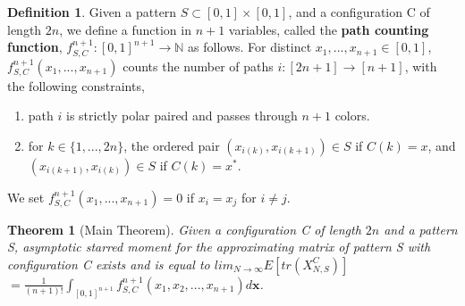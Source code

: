 \documentclass[12pt]{amsart}
\newtheorem{thm}{Theorem}[section]
\theoremstyle{definition}
\newtheorem{defn}{Definition}[section]
\theoremstyle{remark}
\newcommand\red{\color{red}}
\begin{document}
\begin{defn}

    Given a pattern $S \subset [0,1] \times [0,1]$, and a configuration C of length $2n$, we define a function in $n+1$ variables, called the \textbf{path counting function}, $f_{S,C}^{n+1} : [0,1]^{n+1} \to \mathbb{N}$ as follows. For distinct $x_1,...,x_{n+1} \in [0,1]$, $f_{S,C}^{n+1}(x_1,...,x_{n+1})$ counts the number of paths $i:[2n+1] \to [n+1]$, with the following constraints, 
    \begin{enumerate}
    \item path $i$ is strictly polar paired and passes through $n+1$ colors.
        \item  for $k \in \{1,...,2n\}$, the ordered pair $(x_{i(k)},x_{i(k+1)}) \in S$ if $C(k)=x$, and $(x_{i(k+1)},x_{i(k)}) \in S$ if $C(k)=x^*$.
    \end{enumerate} 
     We set $f_{S,C}^{n+1}(x_1,...,x_{n+1})=0$ if $x_i=x_j$ for $i \neq j$.\\ 
     
\end{defn}
	
\begin{thm}[Main Theorem] \label{mainthm}
    Given a configuration C of length $2n$ and a pattern S, asymptotic starred moment for the approximating matrix of pattern S with configuration C exists and is equal to $ lim_{N \to \infty} E[tr(X_{N,S}^C)]$ $= \frac{1}{(n+1)!}\int_{[0,1]^{n+1}}f_{S,C}^{n+1}(x_1,x_2,...,x_{n+1})d\mathbf{x}$.
\end{thm}

\end{document}
